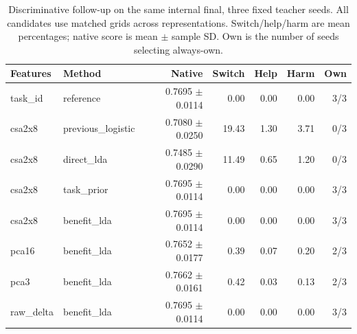 \begin{table}[htbp]\centering\scriptsize
\caption{Discriminative follow-up on the same internal final, three fixed teacher seeds. All candidates use matched grids across representations. Switch/help/harm are mean percentages; native score is mean $\pm$ sample SD. Own is the number of seeds selecting always-own.}
\begin{tabular}{llrrrrr}\toprule
Features & Method & Native & Switch & Help & Harm & Own \\ \midrule
task\_id & reference & 0.7695 $\pm$ 0.0114 & 0.00 & 0.00 & 0.00 & 3/3 \\
csa2x8 & previous\_logistic & 0.7080 $\pm$ 0.0250 & 19.43 & 1.30 & 3.71 & 0/3 \\
csa2x8 & direct\_lda & 0.7485 $\pm$ 0.0290 & 11.49 & 0.65 & 1.20 & 0/3 \\
csa2x8 & task\_prior & 0.7695 $\pm$ 0.0114 & 0.00 & 0.00 & 0.00 & 3/3 \\
csa2x8 & benefit\_lda & 0.7695 $\pm$ 0.0114 & 0.00 & 0.00 & 0.00 & 3/3 \\
pca16 & benefit\_lda & 0.7652 $\pm$ 0.0177 & 0.39 & 0.07 & 0.20 & 2/3 \\
pca3 & benefit\_lda & 0.7662 $\pm$ 0.0161 & 0.42 & 0.03 & 0.13 & 2/3 \\
raw\_delta & benefit\_lda & 0.7695 $\pm$ 0.0114 & 0.00 & 0.00 & 0.00 & 3/3 \\
\bottomrule\end{tabular}\end{table}
